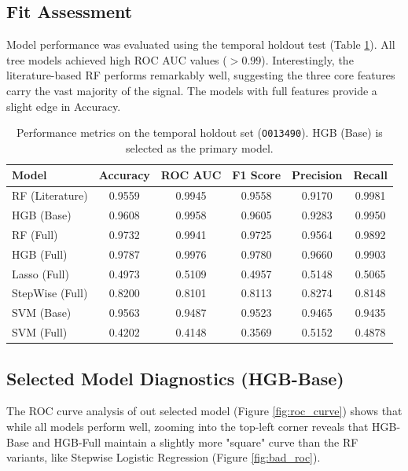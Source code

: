 \subsection{Fit Assessment}
Model performance was evaluated using the temporal holdout test (Table \ref{tab:model_comparison}). All tree models achieved high ROC AUC values ($>0.99$). Interestingly, the literature-based RF performs remarkably well, suggesting the three core features carry the vast majority of the signal. The models with full features provide a slight edge in Accuracy.

\begin{table}[H]
\centering
\begin{tabular}{lccccc}
\toprule
\textbf{Model} & \textbf{Accuracy} & \textbf{ROC AUC} & \textbf{F1 Score} & \textbf{Precision} & \textbf{Recall} \\ 
\midrule
RF (Literature)       & 0.9559 & 0.9945 & 0.9558 & 0.9170 & 0.9981 \\
HGB (Base)  & 0.9608 & 0.9958 & 0.9605 & 0.9283 & 0.9950 \\
RF (Full)             & 0.9732 & 0.9941 & 0.9725 & 0.9564 & 0.9892 \\
HGB (Full)            & 0.9787 & 0.9976 & 0.9780 & 0.9660 & 0.9903 \\
Lasso (Full)       & 0.4973 & 0.5109 & 0.4957 & 0.5148 & 0.5065 \\
StepWise (Full)       & 0.8200 & 0.8101 & 0.8113 & 0.8274 & 0.8148 \\
SVM (Base)       & 0.9563 & 0.9487 & 0.9523 & 0.9465 & 0.9435 \\
SVM (Full)       & 0.4202 & 0.4148 & 0.3569 & 0.5152 & 0.4878 \\
\bottomrule
\end{tabular}
\caption{Performance metrics on the temporal holdout set (\texttt{O013490}). HGB (Base) is selected as the primary model.}
\label{tab:model_comparison}
\end{table}

\subsection{Selected Model Diagnostics (HGB-Base)}
The ROC curve analysis of out selected model (Figure \ref{fig:roc_curve}) shows that while all models perform well, zooming into the top-left corner reveals that HGB-Base and HGB-Full maintain a slightly more "square" curve than the RF variants, like Stepwise Logistic Regression (Figure \ref{fig:bad_roc}).

